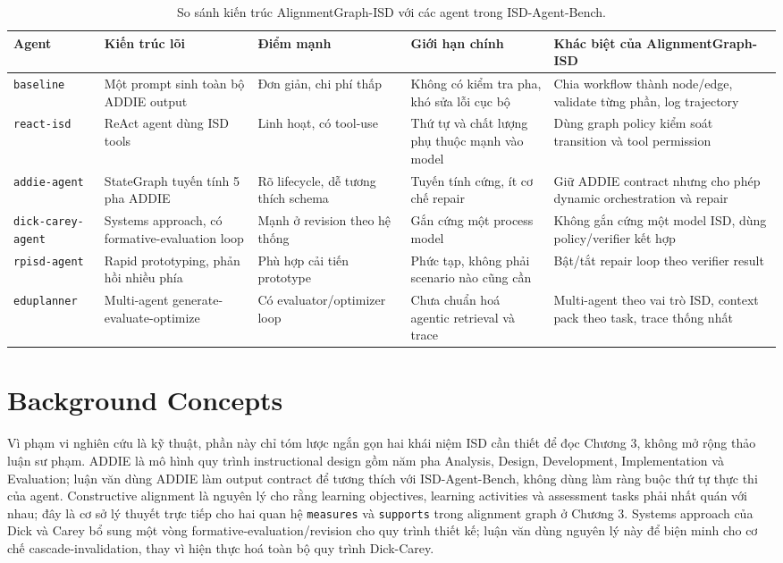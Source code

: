 \documentclass[../main.tex]{subfiles}
\begin{document}
\begin{table}[H]
\centering
\small
\caption{So sánh kiến trúc AlignmentGraph-ISD với các agent trong ISD-Agent-Bench.}
\label{tab:agent-comparison}
\begin{tabular}{p{2.1cm}p{2.6cm}p{2.5cm}p{2.8cm}p{3.2cm}}
\hline
\textbf{Agent} & \textbf{Kiến trúc lõi} & \textbf{Điểm mạnh} & \textbf{Giới hạn chính} & \textbf{Khác biệt của AlignmentGraph-ISD} \\
\hline
\texttt{baseline} & Một prompt sinh toàn bộ ADDIE output & Đơn giản, chi phí thấp & Không có kiểm tra pha, khó sửa lỗi cục bộ & Chia workflow thành node/edge, validate từng phần, log trajectory \\
\texttt{react-isd} & ReAct agent dùng ISD tools & Linh hoạt, có tool-use & Thứ tự và chất lượng phụ thuộc mạnh vào model & Dùng graph policy kiểm soát transition và tool permission \\
\texttt{addie-agent} & StateGraph tuyến tính 5 pha ADDIE & Rõ lifecycle, dễ tương thích schema & Tuyến tính cứng, ít cơ chế repair & Giữ ADDIE contract nhưng cho phép dynamic orchestration và repair \\
\texttt{dick-carey-agent} & Systems approach, có formative-evaluation loop & Mạnh ở revision theo hệ thống & Gắn cứng một process model & Không gắn cứng một model ISD, dùng policy/verifier kết hợp \\
\texttt{rpisd-agent} & Rapid prototyping, phản hồi nhiều phía & Phù hợp cải tiến prototype & Phức tạp, không phải scenario nào cũng cần & Bật/tắt repair loop theo verifier result \\
\texttt{eduplanner} & Multi-agent generate-evaluate-optimize & Có evaluator/optimizer loop & Chưa chuẩn hoá agentic retrieval và trace & Multi-agent theo vai trò ISD, context pack theo task, trace thống nhất \\
\hline
\end{tabular}
\end{table}

\section{Background Concepts}

Vì phạm vi nghiên cứu là kỹ thuật, phần này chỉ tóm lược ngắn gọn hai khái niệm ISD cần thiết để đọc Chương 3, không mở rộng thảo luận sư phạm. ADDIE \cite{branch2009addie} là mô hình quy trình instructional design gồm năm pha Analysis, Design, Development, Implementation và Evaluation; luận văn dùng ADDIE làm output contract để tương thích với ISD-Agent-Bench, không dùng làm ràng buộc thứ tự thực thi của agent. Constructive alignment \cite{biggs1996enhancing} là nguyên lý cho rằng learning objectives, learning activities và assessment tasks phải nhất quán với nhau; đây là cơ sở lý thuyết trực tiếp cho hai quan hệ \texttt{measures} và \texttt{supports} trong alignment graph ở Chương 3. Systems approach của Dick và Carey \cite{dick1978systematic} bổ sung một vòng formative-evaluation/revision cho quy trình thiết kế; luận văn dùng nguyên lý này để biện minh cho cơ chế cascade-invalidation, thay vì hiện thực hoá toàn bộ quy trình Dick-Carey.
\end{document}

